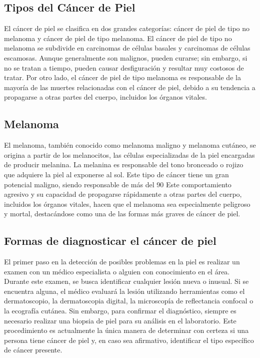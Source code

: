 \subsection{Tipos del Cáncer de Piel}
El cáncer de piel se clasifica en dos grandes categorías: cáncer de piel de tipo no melanoma y cáncer de piel de tipo melanoma. El cáncer de piel de tipo no melanoma se subdivide en carcinomas de células basales y carcinomas de células escamosas. Aunque generalmente son malignos, pueden curarse; sin embargo, si no se tratan a tiempo, pueden causar desfiguración y resultar muy costosos de tratar. Por otro lado, el cáncer de piel de tipo melanoma es responsable de la mayoría de las muertes relacionadas con el cáncer de piel, debido a su tendencia a propagarse a otras partes del cuerpo, incluidos los órganos vitales.

\subsection{Melanoma}
El melanoma, también conocido como melanoma maligno y melanoma cutáneo, se origina a partir de los melanocitos, las células especializadas de la piel encargadas de producir melanina. La melanina es responsable del tono bronceado o rojizo que adquiere la piel al exponerse al sol. Este tipo de cáncer tiene un gran potencial maligno, siendo responsable de más del 90%
Este comportamiento agresivo y su capacidad de propagarse rápidamente a otras partes del cuerpo, incluidos los órganos vitales, hacen que el melanoma sea especialmente peligroso y mortal, destacándose como una de las formas más graves de cáncer de piel.

\subsection{Formas de diagnosticar el cáncer de piel}
El primer paso en la detección de posibles problemas en la piel es realizar un examen con un médico especialista o alguien con conocimiento en el área. Durante este examen, se busca identificar cualquier lesión nueva o inusual. Si se encuentra alguna, el médico evaluará la lesión utilizando herramientas como el dermatoscopio, la dermatoscopia digital, la microscopía de reflectancia confocal o la ecografía cutánea. Sin embargo, para confirmar el diagnóstico, siempre es necesario realizar una biopsia de piel para su análisis en el laboratorio. Este procedimiento es actualmente la única manera de determinar con certeza si una persona tiene cáncer de piel y, en caso sea afirmativo, identificar el tipo específico de cáncer presente. \parencite{clinica_barcelona}
